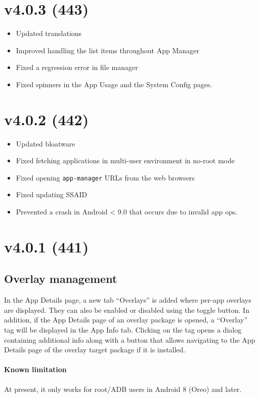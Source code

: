 \section{v4.0.3 (443)}\label{sec:v4.0.3-(443)}
\begin{itemize}
    \item Updated translations
    \item Improved handling the list items throughout App Manager
    \item Fixed a regression error in file manager
    \item Fixed spinners in the App Usage and the System Config pages.
\end{itemize}

\section{v4.0.2 (442)}\label{sec:v4.0.2-(442)}
\begin{itemize}
    \item Updated bloatware
    \item Fixed fetching applications in multi-user environment in no-root mode
    \item Fixed opening \texttt{app-manager} URLs from the web browsers
    \item Fixed updating SSAID
    \item Prevented a crash in Android < 9.0 that occurs due to invalid app ops.
\end{itemize}

\section{v4.0.1 (441)}\label{sec:v4.0.1-(441)}
\subsection{Overlay management}
In the App Details page, a new tab ``Overlays'' is added where per-app overlays are displayed. They
can also be enabled or disabled using the toggle button. In addition, if the App Details page of an
overlay package is opened, a ``Overlay'' tag will be displayed in the App Info tab. Clicking on the
tag opens a dialog containing additional info along with a button that allows navigating to the
App Details page of the overlay target package if it is installed.

\paragraph{Known limitation} At present, it only works for root/ADB users in Android 8 (Oreo) and
later.

